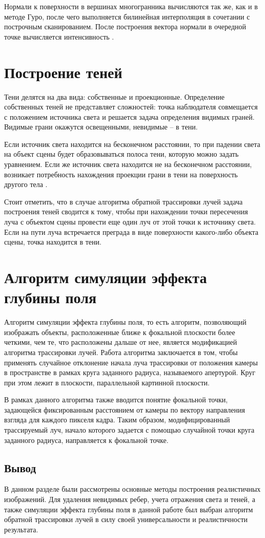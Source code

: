 Нормали к поверхности в вершинах многогранника вычисляются так же, как и в методе Гуро, после чего выполняется билинейная интерполяция в сочетании с построчным сканированием. После построения вектора нормали в очередной точке вычисляется интенсивность \cite{lit5}.

\section{Построение теней}
Тени делятся на два вида: собственные и проекционные. Определение собственных теней не представляет сложностей: точка наблюдателя совмещается с положением источника света и решается задача определения видимых граней. Видимые грани окажутся освещенными, невидимые -- в тени.

Если источник света находится на бесконечном расстоянии, то при падении света на объект сцены будет образовываться полоса тени, которую можно задать уравнением. Если же источник света находится не на бесконечном расстоянии, возникает потребность нахождения проекции грани в тени на поверхность другого тела \cite{lit6}.

Стоит отметить, что в случае алгоритма обратной трассировки лучей задача построения теней сводится к тому, чтобы при нахождении точки пересечения луча с объектом сцены провести еще один луч от этой точки к источнику света. Если на пути луча встречается преграда в виде поверхности какого-либо объекта сцены, точка находится в тени.

\section{Алгоритм симуляции эффекта глубины поля}
Алгоритм симуляции эффекта глубины поля, то есть алгоритм, позволяющий изображать объекты, расположенные ближе к фокальной плоскости более четкими, чем те, что расположены дальше от нее, является модификацией алгоритма трассировки лучей. Работа алгоритма заключается в том, чтобы применять случайное отклонение начала луча трассировки от положения камеры в пространстве в рамках круга заданного радиуса, называемого апертурой. Круг при этом лежит в плоскости, параллельной картинной плоскости.

В рамках данного алгоритма также вводится понятие фокальной точки, задающейся фиксированным расстоянием от камеры по вектору направления взгляда для каждого пикселя кадра. Таким образом, модифицированный трассируемый луч, начало которого задается с помощью случайной точки круга заданного радиуса, направляется к фокальной точке.


\subsection*{Вывод}

В данном разделе были рассмотрены основные методы построения реалистичных изображений. Для удаления невидимых ребер, учета отражения света и теней, а также симуляции эффекта глубины поля в данной работе был выбран алгоритм обратной трассировки лучей в силу своей универсальности и реалистичности результата.

\clearpage
